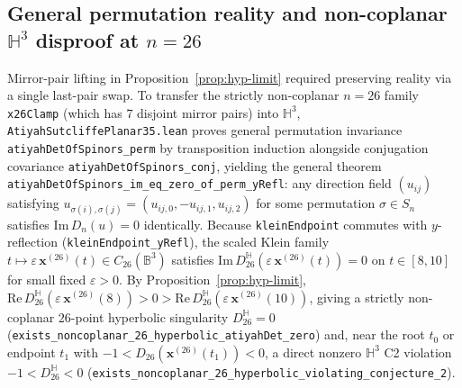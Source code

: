 \documentclass[11pt,reqno]{amsart}
\theoremstyle{remark}
\newcommand{\B}{\mathbb{B}}
\newcommand{\Hy}{\mathbb{H}}
\begin{document}
\subsection{General permutation reality and non-coplanar $\Hy^3$ disproof at $n = 26$}
Mirror-pair lifting in Proposition~\ref{prop:hyp-limit} required preserving reality via a single last-pair swap.
To transfer the strictly non-coplanar $n = 26$ family \texttt{x26Clamp} (which has $7$ disjoint mirror pairs) into $\Hy^3$, \texttt{AtiyahSutcliffePlanar35.lean} proves general permutation invariance \texttt{atiyahDetOfSpinors\_perm} by transposition induction alongside conjugation covariance \texttt{atiyahDetOfSpinors\_conj}, yielding the general theorem \texttt{atiyahDetOfSpinors\_im\_eq\_zero\_of\_perm\_yRefl}: any direction field $(u_{ij})$ satisfying $u_{\sigma(i),\sigma(j)} = (u_{ij,0}, -u_{ij,1}, u_{ij,2})$ for some permutation $\sigma \in S_n$ satisfies $\mathrm{Im}\, D_n(u) = 0$ identically.
Because \texttt{kleinEndpoint} commutes with $y$-reflection (\texttt{kleinEndpoint\_yRefl}), the scaled Klein family $t \mapsto \varepsilon\,\mathbf{x}^{(26)}(t) \in C_{26}(\B^3)$ satisfies $\mathrm{Im}\, D_{26}^{\Hy}(\varepsilon\,\mathbf{x}^{(26)}(t)) = 0$ on $t \in [8, 10]$ for small fixed $\varepsilon > 0$.
By Proposition~\ref{prop:hyp-limit}, $\mathrm{Re}\, D_{26}^{\Hy}(\varepsilon\,\mathbf{x}^{(26)}(8)) > 0 > \mathrm{Re}\, D_{26}^{\Hy}(\varepsilon\,\mathbf{x}^{(26)}(10))$, giving a strictly non-coplanar $26$-point hyperbolic singularity $D_{26}^{\Hy} = 0$ (\texttt{exists\_noncoplanar\_26\_hyperbolic\_atiyahDet\_zero}) and, near the root $t_0$ or endpoint $t_1$ with $-1 < D_{26}(\mathbf{x}^{(26)}(t_1)) < 0$, a direct nonzero $\Hy^3$ C2 violation $-1 < D_{26}^{\Hy} < 0$ (\texttt{exists\_noncoplanar\_26\_hyperbolic\_violating\_conjecture\_2}).
\end{document}
